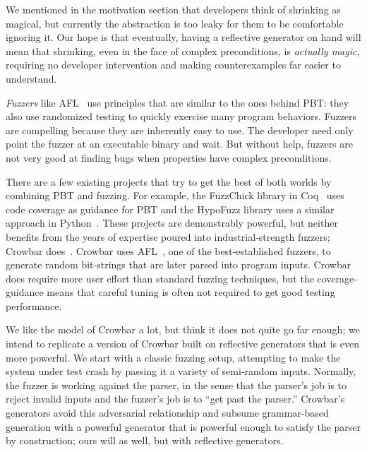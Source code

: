 We mentioned in the motivation section that developers think of
shrinking as magical, but currently the abstraction is too leaky for them to
be comfortable ignoring it.  Our hope is that eventually, having a reflective
generator on hand will mean that shrinking, even in the face of complex
preconditions, is {\em actually magic}, requiring no developer intervention and
making counterexamples far easier to understand.

{\em Fuzzers} like AFL~\cite{afl-readme} use principles that are similar to the
ones behind PBT: they also use randomized testing to quickly exercise many
program behaviors. Fuzzers are compelling because they are
inherently easy to use. The developer need only point the fuzzer at an
executable binary and
wait. But without help, fuzzers are not very good at finding
bugs when properties have complex preconditions. 

There are a few existing projects that try to get the best of both worlds by
combining PBT and fuzzing.
For example, the FuzzChick library in Coq~\cite{OLDlampropoulos19fuzzchick}
uses code coverage as guidance for PBT and the HypoFuzz library uses a
similar approach in Python~\cite{hatfield-dodds_hypofuzz_nodate}. These projects
are demonstrably powerful, but neither benefits from the years of expertise
poured into industrial-strength fuzzers; Crowbar
does~\cite{dolan2017testing}. Crowbar uses
AFL~\cite{afl-readme}, one of the best-established
fuzzers, to generate random bit-strings that are later parsed into program
inputs. Crowbar does require more user effort than standard fuzzing techniques,
but the coverage-guidance means that careful tuning is often not required to get
good testing performance.

We like the model of Crowbar a lot, but think it does not quite go far enough;
we intend to replicate a version of Crowbar built on reflective generators that
is even more powerful.
We start with a classic fuzzing setup, attempting to make the system under test
crash by passing it a variety of semi-random inputs. Normally, the fuzzer is
working against the parser, in the sense that the parser's job is to reject
invalid inputs and the fuzzer's job is to ``get past the parser.'' Crowbar's
generators avoid this adversarial relationship and subsume grammar-based
generation with a powerful generator that is powerful enough to satisfy the
parser by construction; ours will as well, but with reflective generators.

